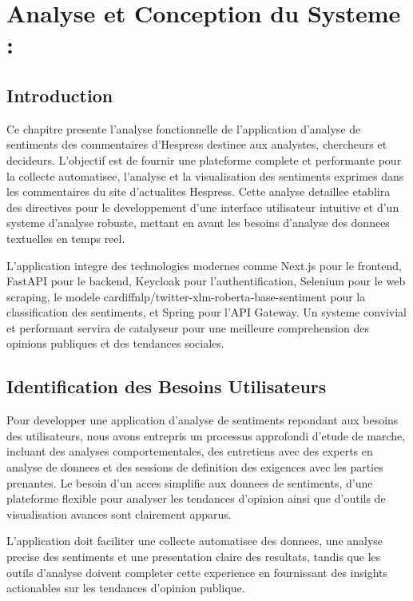 \chapter{Analyse et Conception du Systeme :}

\section{Introduction}

Ce chapitre presente l'analyse fonctionnelle de l'application d'analyse de sentiments des commentaires d'Hespress destinee aux analystes, chercheurs et decideurs. L'objectif est de fournir une plateforme complete et performante pour la collecte automatisee, l'analyse et la visualisation des sentiments exprimes dans les commentaires du site d'actualites Hespress. Cette analyse detaillee etablira des directives pour le developpement d'une interface utilisateur intuitive et d'un systeme d'analyse robuste, mettant en avant les besoins d'analyse des donnees textuelles en temps reel.

L'application integre des technologies modernes comme Next.js pour le frontend, FastAPI pour le backend, Keycloak pour l'authentification, Selenium pour le web scraping, le modele cardiffnlp/twitter-xlm-roberta-base-sentiment pour la classification des sentiments, et Spring pour l'API Gateway. Un systeme convivial et performant servira de catalyseur pour une meilleure comprehension des opinions publiques et des tendances sociales.

\section{Identification des Besoins Utilisateurs}

Pour developper une application d'analyse de sentiments repondant aux besoins des utilisateurs, nous avons entrepris un processus approfondi d'etude de marche, incluant des analyses comportementales, des entretiens avec des experts en analyse de donnees et des sessions de definition des exigences avec les parties prenantes. Le besoin d'un acces simplifie aux donnees de sentiments, d'une plateforme flexible pour analyser les tendances d'opinion ainsi que d'outils de visualisation avances sont clairement apparus.

L'application doit faciliter une collecte automatisee des donnees, une analyse precise des sentiments et une presentation claire des resultats, tandis que les outils d'analyse doivent completer cette experience en fournissant des insights actionables sur les tendances d'opinion publique.

